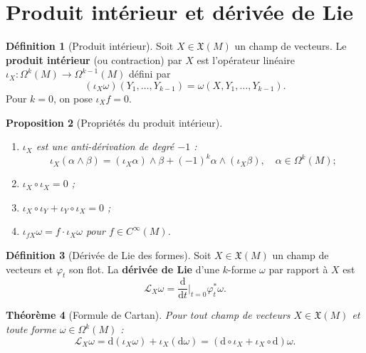 \documentclass[12pt,a4paper,openany]{book}
\theoremstyle{definition}
\newtheorem{definition}{Définition}[chapter]
\theoremstyle{plain}
\newtheorem{theoreme}[definition]{Théorème}
\newtheorem{proposition}[definition]{Proposition}
\theoremstyle{remark}
\newcommand{\dd}{\mathrm{d}}
\begin{document}
\section{Produit intérieur et dérivée de Lie}\label{sec:produit-interieur-lie}

\begin{definition}[Produit intérieur]\label{def:produit-interieur}%
Soit $X \in \mathfrak{X}(M)$ un champ de vecteurs. Le \textbf{produit
intérieur} (ou contraction) par $X$ est l'opérateur linéaire
$\iota_X \colon \Omega^k(M) \to \Omega^{k-1}(M)$ défini par
\[
  (\iota_X \omega)(Y_1, \ldots, Y_{k-1}) = \omega(X, Y_1, \ldots, Y_{k-1}).
\]
Pour $k = 0$, on pose $\iota_X f = 0$.
\end{definition}

\begin{proposition}[Propriétés du produit intérieur]%
\label{prop:proprietes-contraction}
\begin{enumerate}[label=\textup{(\roman*)}]
  \item $\iota_X$ est une \emph{anti-dérivation} de degré $-1$ :
    \[
      \iota_X(\alpha \wedge \beta) = (\iota_X \alpha) \wedge \beta +
        (-1)^k \alpha \wedge (\iota_X \beta),
      \quad \alpha \in \Omega^k(M) ;
    \]
  \item $\iota_X \circ \iota_X = 0$ ;
  \item $\iota_X \circ \iota_Y + \iota_Y \circ \iota_X = 0$ ;
  \item $\iota_{fX} \omega = f \cdot \iota_X \omega$ pour
    $f \in C^\infty(M)$.
\end{enumerate}
\end{proposition}

\begin{definition}[Dérivée de Lie des formes]\label{def:derivee-lie-formes}%
Soit $X \in \mathfrak{X}(M)$ un champ de vecteurs et $\varphi_t$ son
flot. La \textbf{dérivée de Lie} d'une $k$-forme $\omega$ par rapport à
$X$ est
\[
  \mathcal{L}_X \omega = \frac{\dd}{\dd t}\bigg|_{t=0} \varphi_t^* \omega.
\]
\end{definition}

\begin{theoreme}[Formule de Cartan]\label{thm:formule-cartan}%
Pour tout champ de vecteurs $X \in \mathfrak{X}(M)$ et toute forme
$\omega \in \Omega^k(M)$ :
\[
  \boxed{\mathcal{L}_X \omega = \dd(\iota_X \omega) +
    \iota_X(\dd\omega) = (\dd \circ \iota_X + \iota_X \circ \dd)\omega.}
\]
\end{theoreme}
\end{document}
